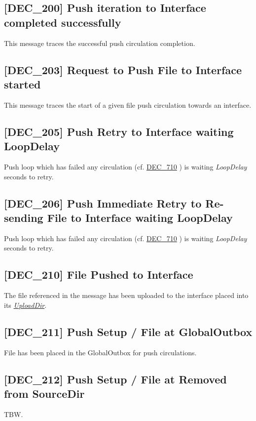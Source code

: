 \documentclass[dec_sum_main.tex]{subfiles}
\begin{document}
\label{DEC200}
\subsection{[DEC\_200] Push iteration to Interface completed successfully}
This message traces the successful push circulation completion.

\label{DEC203}
\subsection{[DEC\_203] Request to Push File to Interface started}
This message traces the start of a given file push circulation towards an interface.

\label{DEC205}
\subsection{[DEC\_205] Push Retry to Interface waiting LoopDelay}
Push loop which has failed any circulation (cf. \hyperref[DEC710]{DEC\_710} ) is waiting \textit{LoopDelay} seconds to retry.

\label{DEC206}
\subsection{[DEC\_206] Push Immediate Retry to Re-sending File to Interface waiting LoopDelay}
Push loop which has failed any circulation (cf. \hyperref[DEC710]{DEC\_710} ) is waiting \textit{LoopDelay} seconds to retry.


\label{DEC210}
\subsection{[DEC\_210] File Pushed to Interface}
The file referenced in the message has been uploaded to the interface placed into its \hyperref[Upload Rules]{\textit{UploadDir}}.

\label{DEC211}
\subsection{[DEC\_211] Push Setup / File at GlobalOutbox}
File has been placed in the GlobalOutbox for push circulations.

\label{DEC212}
\subsection{[DEC\_212] Push Setup / File at Removed from SourceDir}
TBW.

\label{DEC213}
\end{document}
